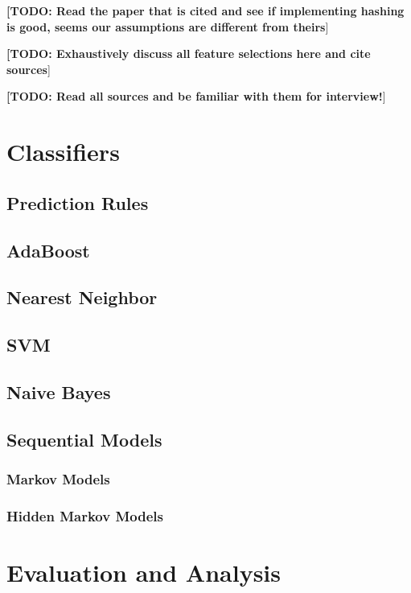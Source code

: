 \documentclass[10pt]{article}
\def\TODO#1{\noindent\textbf{[TODO: #1}]}
\begin{document}
 
\TODO{Read the paper that is cited and see if implementing hashing is good, seems our assumptions are different from theirs}

\TODO{Exhaustively discuss all feature selections here and cite sources}

\TODO{Read all sources and be familiar with them for interview!}
 

\section{Classifiers}
\label{sec:techniques}

\subsection{Prediction Rules}
\label{sec:}

\subsection{AdaBoost}
\label{sec:}

\subsection{Nearest Neighbor}
\label{sec:}

\subsection{SVM}
\label{sec:}

\subsection{Naive Bayes}
\label{sec:}

\subsection{Sequential Models}
\label{sec:}

\subsubsection{Markov Models}
\label{sec:}

\subsubsection{Hidden Markov Models}
\label{sec:}

\section{Evaluation and Analysis}
\end{document}
